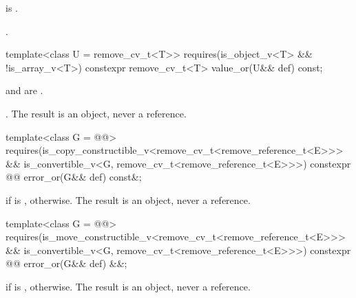 \begin{itemdescr}
\pnum
\expects
{} is .

\pnum
\returns
{}.
\end{itemdescr}

%
\begin{itemdecl}
template<class U = remove_cv_t<T>>
  requires(is_object_v<T> && !is_array_v<T>)
constexpr remove_cv_t<T> value_or(U&& def) const;
\end{itemdecl}

\begin{itemdescr}
\pnum
\mandates
{} and  are .

\pnum
\returns
{}. The result is an object, never a reference.
\end{itemdescr}

%
\begin{itemdecl}
template<class G = @@>
  requires(is_copy_constructible_v<remove_cv_t<remove_reference_t<E>>> &&
           is_convertible_v<G, remove_cv_t<remove_reference_t<E>>>)
constexpr @@ error_or(G&& def) const&;
\end{itemdecl}

\begin{itemdescr}
\pnum
\returns
{} if  is ,  otherwise. The result is an object, never a reference.
\end{itemdescr}

%
\begin{itemdecl}
template<class G = @@>
  requires(is_move_constructible_v<remove_cv_t<remove_reference_t<E>>> &&
           is_convertible_v<G, remove_cv_t<remove_reference_t<E>>>)
constexpr @@ error_or(G&& def) &&;
\end{itemdecl}

\begin{itemdescr}
\pnum
\returns
{} if  is ,  otherwise. The result is an object, never a reference.
\end{itemdescr}

